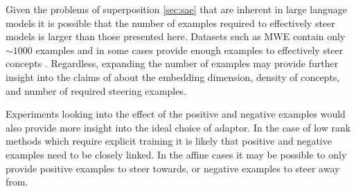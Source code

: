 Given the problems of superposition \cref{sec:sae} that are inherent in large language models it is possible that the number of examples required to effectively steer models is larger than those presented here.
Datasets such as MWE contain only $\sim 1000$ examples and in some cases provide enough examples to effectively steer concepts \citep{steerability}.
Regardless, expanding the number of examples may provide further insight into the claims of \citet{steering-clear} about the embedding dimension, density of concepts, and number of required steering examples.

Experiments looking into the effect of the positive and negative examples would also provide more insight into the ideal choice of adaptor.
In the case of low rank methods which require explicit training it is likely that positive and negative examples need to be closely linked.
In the affine cases it may be possible to only provide positive examples to steer towards, or negative examples to steer away from.

